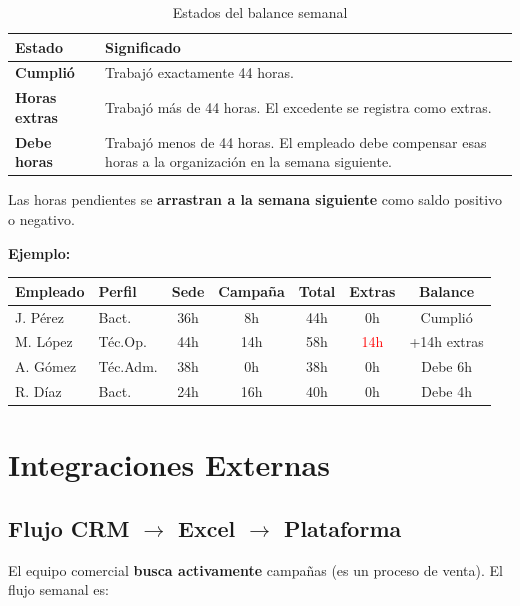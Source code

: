 \documentclass[9pt,a4paper]{extarticle}
\begin{document}
\begin{table}[h!]
\centering
\begin{tabularx}{\textwidth}{|l|X|}
\hline
\textbf{Estado} & \textbf{Significado} \\
\hline
\rowcolor{verdeclaro}
\textbf{Cumpli\'{o}} & Trabaj\'{o} exactamente 44 horas. \\
\hline
\textbf{Horas extras} & Trabaj\'{o} m\'{a}s de 44 horas. El excedente se registra como extras. \\
\hline
\textbf{Debe horas} & Trabaj\'{o} menos de 44 horas. El empleado debe compensar esas horas a la organizaci\'{o}n en la semana siguiente. \\
\hline
\end{tabularx}
\caption{Estados del balance semanal}
\end{table}

Las horas pendientes se \textbf{arrastran a la semana siguiente} como saldo positivo o negativo.

\textbf{Ejemplo:}

\small
\begin{tabular}{|l|l|c|c|c|c|c|}
\hline
\textbf{Empleado} & \textbf{Perfil} & \textbf{Sede} & \textbf{Campaña} & \textbf{Total} & \textbf{Extras} & \textbf{Balance} \\
\hline
J. P\'{e}rez & Bact. & 36h & 8h & 44h & 0h & Cumpli\'{o} \\
\hline
M. L\'{o}pez & T\'{e}c.Op. & 44h & 14h & 58h & \textcolor{red}{14h} & +14h extras \\
\hline
A. G\'{o}mez & T\'{e}c.Adm. & 38h & 0h & 38h & 0h & Debe 6h \\
\hline
R. D\'{i}az & Bact. & 24h & 16h & 40h & 0h & Debe 4h \\
\hline
\end{tabular}
\normalsize


\section{Integraciones Externas}

\subsection{Flujo CRM $\rightarrow$ Excel $\rightarrow$ Plataforma}

El equipo comercial \textbf{busca activamente} campañas (es un proceso de venta). El flujo semanal es:
\end{document}
